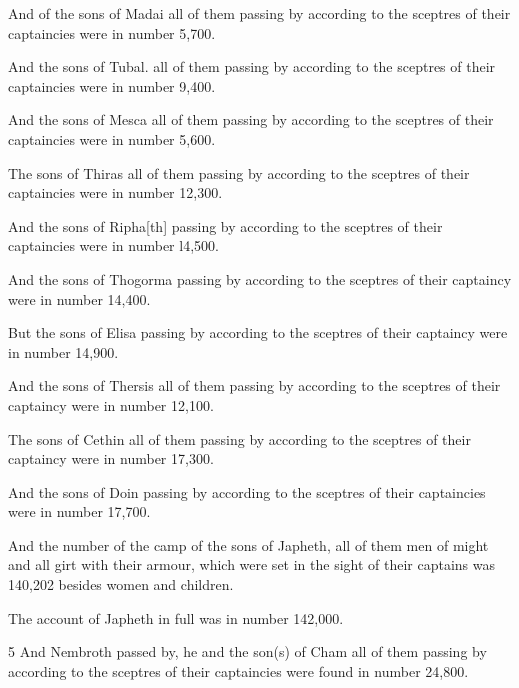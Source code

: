 \par And of the sons of Madai all of them passing by according to the sceptres of their captaincies were in number 5,700.

\par And the sons of Tubal. all of them passing by according to the sceptres of their captaincies were in number 9,400.

\par And the sons of Mesca all of them passing by according to the sceptres of their captaincies were in number 5,600.

\par The sons of Thiras all of them passing by according to the sceptres of their captaincies were in number 12,300.

\par And the sons of Ripha[th] passing by according to the sceptres of their captaincies were in number l4,500.

\par And the sons of Thogorma passing by according to the sceptres of their captaincy were in number 14,400.

\par But the sons of Elisa passing by according to the sceptres of their captaincy were in number 14,900.

\par And the sons of Thersis all of them passing by according to the sceptres of their captaincy were in number 12,100.

\par The sons of Cethin all of them passing by according to the sceptres of their captaincy were in number 17,300.

\par And the sons of Doin passing by according to the sceptres of their captaincies were in number 17,700.

\par And the number of the camp of the sons of Japheth, all of them men of might and all girt with their armour, which were set in the sight of their captains was 140,202 besides women and children.

\par The account of Japheth in full was in number 142,000.

\par 5 And Nembroth passed by, he and the son(s) of Cham all of them passing by according to the sceptres of their captaincies were found in number 24,800.

